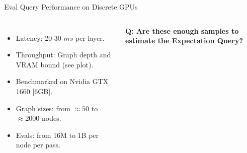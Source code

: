 \begin{frame}{Eval Query Performance on Discrete GPUs}
  \begin{columns}
    {
      \begin{itemize}
          \item {Latency: 20-30 $ms$ per layer.}
          \item {Throughput: Graph depth and VRAM bound (see plot).}
          \item {Benchmarked on Nvidia GTX 1660 [6GB].}
          \item {Graph sizes: from $\approx 50$ to $\approx 2000$ nodes.}
          \item {Evals: from 16M to 1B per node per pass.}
      \end{itemize}
      \vspace{10pt}
      \textbf{Q: Are these enough samples to estimate the Expectation Query?}
    }
        \centering
        
  \end{columns}
\end{frame}



